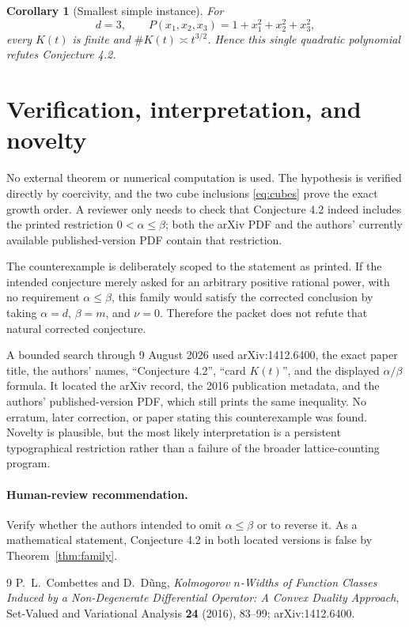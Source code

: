 \documentclass[11pt]{article}
\newtheorem{corollary}[theorem]{Corollary}
\begin{document}
\begin{corollary}[Smallest simple instance]
For
\[
 d=3,\qquad P(x_1,x_2,x_3)=1+x_1^2+x_2^2+x_3^2,
\]
every $K(t)$ is finite and $\#K(t)\asymp t^{3/2}$.  Hence this single
quadratic polynomial refutes Conjecture 4.2.
\end{corollary}

\section{Verification, interpretation, and novelty}

No external theorem or numerical computation is used.  The hypothesis is
verified directly by coercivity, and the two cube inclusions
\eqref{eq:cubes} prove the exact growth order.  A reviewer only needs to
check that Conjecture 4.2 indeed includes the printed restriction
$0<\alpha\le\beta$; both the arXiv PDF and the authors' currently available
published-version PDF contain that restriction.

The counterexample is deliberately scoped to the statement as printed.  If
the intended conjecture merely asked for an arbitrary positive rational
power, with no requirement $\alpha\le\beta$, this family would satisfy the
corrected conclusion by taking $\alpha=d$, $\beta=m$, and $\nu=0$.
Therefore the packet does not refute that natural corrected conjecture.

A bounded search through 9 August 2026 used arXiv:1412.6400, the exact
paper title, the authors' names, ``Conjecture 4.2'', ``card $K(t)$'', and
the displayed $\alpha/\beta$ formula.  It located the arXiv record, the
2016 publication metadata, and the authors' published-version PDF, which
still prints the same inequality.  No erratum, later correction, or paper
stating this counterexample was found.  Novelty is plausible, but the
most likely interpretation is a persistent typographical restriction rather
than a failure of the broader lattice-counting program.

\paragraph{Human-review recommendation.}
Verify whether the authors intended to omit $\alpha\le\beta$ or to reverse
it.  As a mathematical statement, Conjecture 4.2 in both located versions
is false by Theorem~\ref{thm:family}.

\begin{thebibliography}{9}
P.~L.~Combettes and D.~D\~ung,
\emph{Kolmogorov $n$-Widths of Function Classes Induced by a Non-Degenerate
Differential Operator: A Convex Duality Approach},
Set-Valued and Variational Analysis \textbf{24} (2016), 83--99;
arXiv:1412.6400.
\end{thebibliography}
\end{document}
